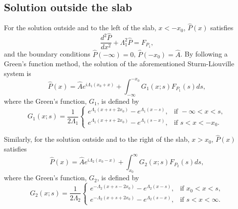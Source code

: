 \documentclass{aastex61}
\begin{document}
\subsection{Solution outside the slab}
For the solution outside and to the left of the slab, $x < -x_0$, $\hat{P}(x)$ satisfies
\begin{equation}
\frac{d^2\hat{P}}{dx^2} + \Lambda_1^2 \hat{P} = F_{P_1},
\end{equation}
and the boundary conditions $\hat{P}(-\infty) = 0$, $\hat{P}(-x_0) = \hat{A}$. By following a Green's function method, the solution of the aforementioned Sturm-Liouville system is
\begin{equation}
\hat{P}(x) = \hat{A}e^{i\Lambda_1(x_0+x)} + \int_{-\infty}^{-x_0} G_1(x;s) F_{P_1}(s) ds,
\end{equation}
where the Green's function, $G_1$, is defined by
\begin{equation}
G_1(x;s) = \frac{1}{2\Lambda_1}
\begin{cases}
e^{\Lambda_1(x+s+2x_0)} - e^{\Lambda_1(x-s)}, & \text{if } -\infty<x<s, \\
e^{\Lambda_1(x+s+2x_0)} - e^{\Lambda_1(s-x)}, & \text{if } s<x<-x_0.
\end{cases}
\end{equation}

Similarly, for the solution outside and to the right of the slab, $x > x_0$, $\hat{P}(x)$ satisfies
\begin{equation}
\hat{P}(x) = \hat{A}e^{i\Lambda_2(x_0-x)} + \int_{x_0}^{\infty} G_2(x;s) F_{P_2}(s) ds,
\end{equation}
where the Green's function, $G_2$, is defined by
\begin{equation}
G_2(x;s) = \frac{1}{2\Lambda_2}
\begin{cases}
e^{-\Lambda_2(x+s-2x_0)} - e^{\Lambda_2(x-s)}, & \text{if } x_0<x<s, \\
e^{-\Lambda_2(x+s+2x_0)} - e^{\Lambda_2(s-x)}, & \text{if } s<x<\infty.
\end{cases}
\end{equation}

\end{document}
